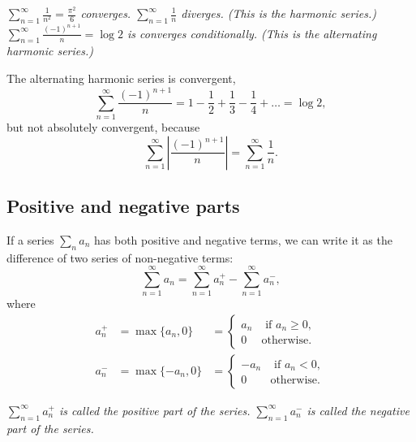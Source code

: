 

\begin{example}
\mbox{}\vspace*{-2ex}
\bit
\it $\displaystyle\sum_{n=1}^{\infty} \frac{1}{n^2} = \frac{\pi^2}{6}$ converges.
\it $\displaystyle\sum_{n=1}^{\infty} \frac{1}{n}$ diverges. (This is the \emph{harmonic series}.)
\it $\displaystyle\sum_{n=1}^{\infty} \frac{(-1)^{n+1}}{n} = \log 2$ is converges conditionally. (This is the \emph{alternating harmonic series}.)
\eit
\end{example}

The alternating harmonic series is convergent,
\[
\sum_{n=1}^{\infty} \frac{(-1)^{n+1}}{n} = 1 - \frac{1}{2} + \frac{1}{3} - \frac{1}{4} + \ldots = \log 2,
\]
but not absolutely convergent, because
\[
\sum_{n=1}^{\infty} \left|\frac{(-1)^{n+1}}{n}\right| = \sum_{n=1}^{\infty}\frac{1}{n}.
\]

\subsection{Positive and negative parts}

If a series $\sum_n a_n$ has both positive and negative terms, we can write it as the difference of two series of non-negative terms:
\[
\sum_{n=1}^{\infty} a_n = \sum_{n=1}^{\infty} a_n^{+} - \sum_{n=1}^{\infty} a_n^{-},
\]
where
\[\begin{array}{lll}
a^{+}_n		& = \max\{a_n,0\}	& = \begin{cases}  a_n & \text{ if } a_n \geq 0, \\ 0 & \text{otherwise.}\end{cases} \\
a^{-}_n		& = \max\{-a_n,0\} 	& = \begin{cases} -a_n & \text{ if } a_n <    0, \\ 0 & \text{otherwise.}\end{cases}
\end{array}\]

\bit
\it $\displaystyle\sum_{n=1}^{\infty} a_n^{+}$ is called the \emph{positive part} of the series.
\it $\displaystyle\sum_{n=1}^{\infty} a_n^{-}$ is called the \emph{negative part} of the series.
\eit

